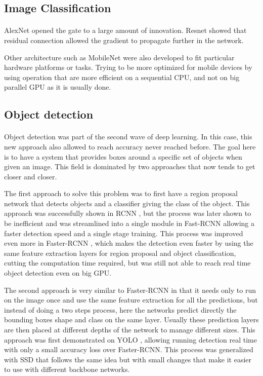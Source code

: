 \subsection{Image Classification}
\paragraph{}
AlexNet \cite{alexnet} opened the gate to a large amount of innovation. Resnet \cite{szegedy2017inception} showed that residual connection allowed the gradient to propagate further in the network.

Other architecture such as MobileNet \cite{sandler2018mobilenetv2, howard2019mobilenetv3} were also developed to fit particular hardware platforms or tasks. Trying to be more optimized for mobile devices by using operation that are more efficient on a sequential CPU, and not on big parallel GPU as it is usually done.

\subsection{Object detection}
\paragraph{}
Object detection was part of the second wave of deep learning. In this case, this new approach also allowed to reach accuracy never reached before. The goal here is to have a system that provides boxes around a specific set of objects when given an image. This field is dominated by two approaches that now tends to get closer and closer.

The first approach to solve this problem was to first have a region proposal network that detects objects and a classifier giving the class of the object. This approach was successfully shown in RCNN \cite{girshick2014rich}, but the process was later shown to be inefficient and was streamlined into a single module in Fast-RCNN \cite{girshick2015fast} allowing a faster detection speed and a single stage training. This process was improved even more in Faster-RCNN \cite{ren2015faster}, which makes the detection even faster by using the same feature extraction layers for region proposal and object classification, cutting the computation time required, but was still not able to reach real time object detection even on big GPU.

The second approach is very similar to Faster-RCNN in that it needs only to run on the image once and use the same feature extraction for all the predictions, but instead of doing a two steps process, here the networks predict directly the bounding boxes shape and class on the same layer. Usually these prediction layers are then placed at different depths of the network to manage different sizes. This approach was first demonstrated on YOLO \cite{yolov3}, allowing running detection real time with only a small accuracy loss over Faster-RCNN. This process was generalized with SSD \cite{liu2016ssd} that follows the same idea but with small changes that make it easier to use with different backbone networks.

